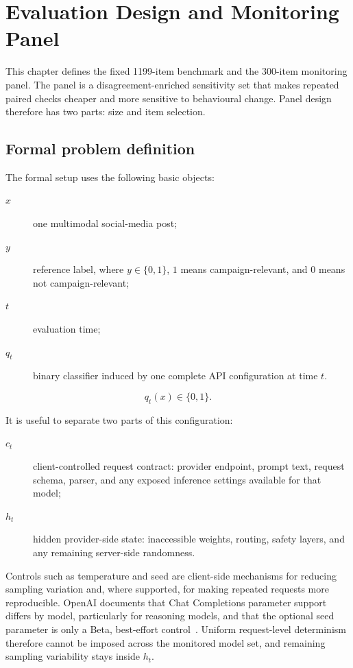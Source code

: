 \chapter{Evaluation Design and Monitoring Panel}
\label{ch:data}

\noindent This chapter defines the fixed 1199-item benchmark and the 300-item monitoring panel. The panel is a disagreement-enriched sensitivity set that makes repeated paired checks cheaper and more sensitive to behavioural change. Panel design therefore has two parts: size and item selection.

\section{Formal problem definition}

The formal setup uses the following basic objects:
\begin{description}
    \item[\(x\)] one multimodal social-media post;
    \item[\(y\)] reference label, where \(y\in\{0,1\}\), \(1\) means campaign-relevant, and \(0\) means not campaign-relevant;
    \item[\(t\)] evaluation time;
    \item[\(q_t\)] binary classifier induced by one complete API configuration at time \(t\).
\end{description}
\begin{equation}
    q_t(x)\in\{0,1\}.
    \label{eq:time-indexed-classifier}
\end{equation}

It is useful to separate two parts of this configuration:
\begin{description}
    \item[\(c_t\)] client-controlled request contract: provider endpoint, prompt text, request schema, parser, and any exposed inference settings available for that model;
    \item[\(h_t\)] hidden provider-side state: inaccessible weights, routing, safety layers, and any remaining server-side randomness.
\end{description}
Controls such as temperature and seed are client-side mechanisms for reducing sampling variation and, where supported, for making repeated requests more reproducible. OpenAI documents that Chat Completions parameter support differs by model, particularly for reasoning models, and that the optional seed parameter is only a Beta, best-effort control~\cite{openai2026chatcompletions}. Uniform request-level determinism therefore cannot be imposed across the monitored model set, and remaining sampling variability stays inside \(h_t\).

